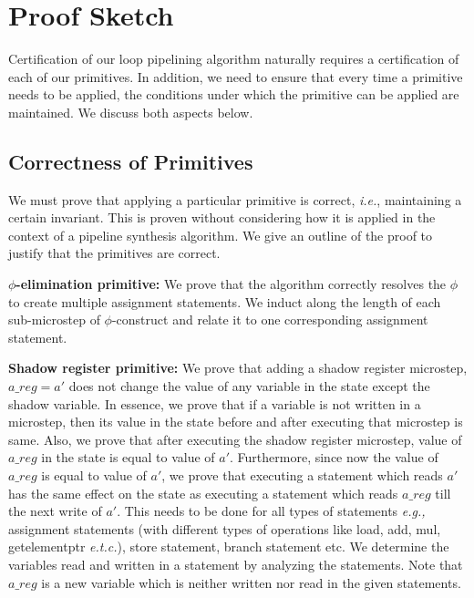 \section{Proof Sketch}
\label{sec:proof}

Certification of our loop pipelining algorithm naturally requires a certification of each of our primitives. In addition, we need to ensure that every time a primitive needs to be applied, the conditions under which the primitive can be applied are maintained. We discuss both aspects below.

\subsection{Correctness of Primitives}
We must prove that applying a particular primitive is correct, 
{\em i.e.}, maintaining a certain invariant. This is proven without
considering how it is applied in the context of a pipeline
synthesis algorithm. We give an outline of the proof to justify 
that the primitives are correct.

{\bf $\phi$-elimination primitive:} We prove that the algorithm correctly resolves the $\phi$ to create multiple assignment statements. We induct along the length of each sub-microstep of $\phi$-construct and
relate it to one corresponding assignment statement.

{\bf Shadow register primitive:} We prove that adding
  a shadow register microstep, $a\_reg = a'$ does not change the value of any variable in the state except the shadow variable. In essence, we prove
  that if a variable is not written in a microstep, then its value in the state before and after executing
  that microstep is same. Also, we prove that after executing the shadow register microstep,
  value of $a\_reg$ in the state is equal to value of $a'$. Furthermore, since now
  the value of $a\_reg$ is equal to value
  of $a'$, we prove that executing a statement which reads $a'$ has the same
  effect on the state as executing a statement which reads
  $a\_reg$ till the next write of $a'$. This needs to be done for all types of
  statements {\em e.g.,} assignment statements (with different types of 
  operations like load, add, mul, getelementptr {\em e.t.c.}), 
  store statement, branch statement etc. We determine the variables read and 
  written in a statement by analyzing the statements. 
  Note that $a\_reg$ is a new variable which
  is neither written nor read in the given statements.

